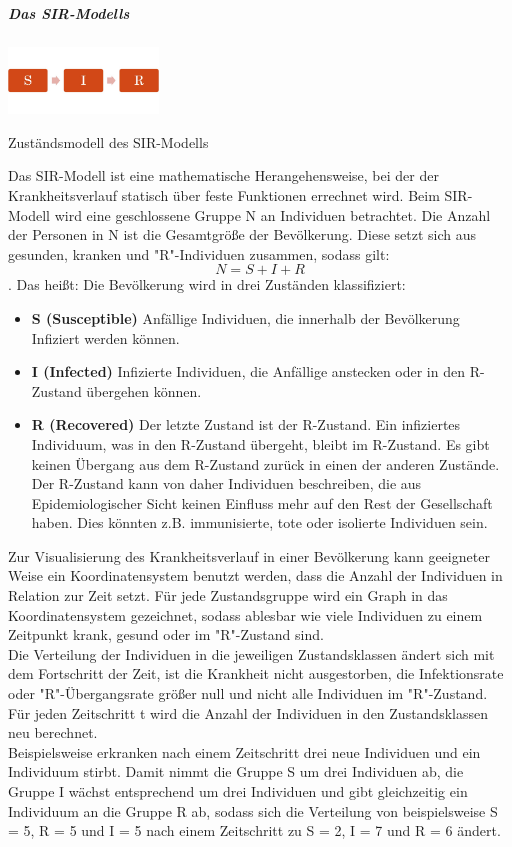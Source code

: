 \subparagraph{Das SIR-Modells}
\includegraphics[width= 0.3\textwidth]{./images/SIR-Modell.jpg}\caption{Zuständsmodell des SIR-Modells}
Das SIR-Modell ist eine mathematische Herangehensweise, bei der der Krankheitsverlauf statisch über feste Funktionen errechnet wird.
Beim SIR-Modell wird eine geschlossene Gruppe N an Individuen betrachtet. Die Anzahl der Personen in N ist die Gesamtgröße der Bevölkerung.
Diese setzt sich aus gesunden, kranken und "R"-Individuen zusammen, sodass gilt:
\begin{equation}
N = S + I + R
\end{equation}
. Das heißt: Die Bevölkerung wird in drei Zuständen klassifiziert:
\begin{itemize}
\item \textbf{S (Susceptible)} Anfällige Individuen, die innerhalb der Bevölkerung Infiziert werden können.
\item \textbf{I (Infected)} Infizierte Individuen, die Anfällige anstecken  oder in den R-Zustand übergehen können.
\item \textbf{R (Recovered)} Der letzte Zustand ist der R-Zustand. Ein infiziertes Individuum, was in den R-Zustand übergeht, bleibt im R-Zustand. Es gibt keinen Übergang aus dem R-Zustand zurück in einen der anderen Zustände. Der R-Zustand kann von daher Individuen beschreiben, die aus Epidemiologischer Sicht keinen Einfluss mehr auf den Rest der Gesellschaft haben. Dies könnten z.B. immunisierte, tote oder isolierte Individuen sein.
\end{itemize}
Zur Visualisierung des Krankheitsverlauf in einer Bevölkerung kann geeigneter Weise ein Koordinatensystem benutzt werden, dass die Anzahl der Individuen in Relation zur Zeit setzt.
Für jede Zustandsgruppe wird ein Graph in das Koordinatensystem gezeichnet, sodass ablesbar wie viele Individuen zu einem Zeitpunkt krank, gesund oder im "R"-Zustand sind.\\
Die Verteilung der Individuen in die jeweiligen Zustandsklassen ändert sich mit dem Fortschritt der Zeit, ist die Krankheit nicht ausgestorben, die Infektionsrate oder "R"-Übergangsrate größer null und nicht alle Individuen im "R"-Zustand.
Für jeden Zeitschritt t wird die Anzahl der Individuen in den Zustandsklassen neu berechnet.\\
Beispielsweise erkranken nach einem Zeitschritt drei neue Individuen und ein Individuum stirbt. Damit nimmt die Gruppe S um drei Individuen ab, die Gruppe I wächst entsprechend um drei Individuen und gibt gleichzeitig ein Individuum an die Gruppe R ab, sodass sich die Verteilung von beispielsweise S = 5, R = 5 und I = 5 nach einem Zeitschritt zu S = 2, I = 7 und R = 6 ändert.

